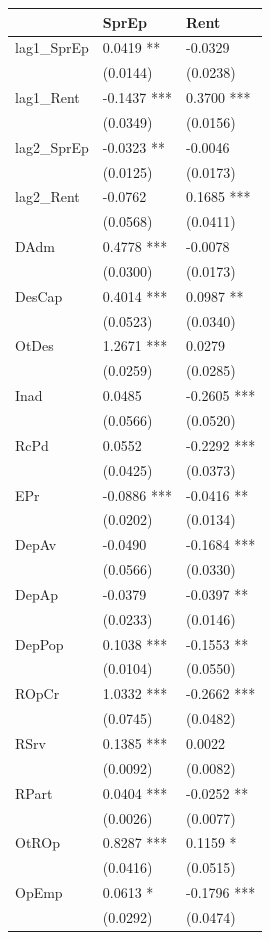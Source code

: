 \documentclass[
  12pt,
  12pt,
  openright,
  oneside,
  a4paper,
  chapter=TITLE,
  section=TITLE,
  subsection=TITLE,
  subsubsection=TITLE,
  english,
  portugues,
  sumario=tradicional]{abntex2}
\begin{document}
\begin{longtable}[]{@{}lll@{}}
\toprule
& SprEp & Rent \\
\midrule
\endhead
lag1\_SprEp & 0.0419 ** & -0.0329 \\
& (0.0144) & (0.0238) \\
lag1\_Rent & -0.1437 *** & 0.3700 *** \\
& (0.0349) & (0.0156) \\
lag2\_SprEp & -0.0323 ** & -0.0046 \\
& (0.0125) & (0.0173) \\
lag2\_Rent & -0.0762 & 0.1685 *** \\
& (0.0568) & (0.0411) \\
DAdm & 0.4778 *** & -0.0078 \\
& (0.0300) & (0.0173) \\
DesCap & 0.4014 *** & 0.0987 ** \\
& (0.0523) & (0.0340) \\
OtDes & 1.2671 *** & 0.0279 \\
& (0.0259) & (0.0285) \\
Inad & 0.0485 & -0.2605 *** \\
& (0.0566) & (0.0520) \\
RcPd & 0.0552 & -0.2292 *** \\
& (0.0425) & (0.0373) \\
EPr & -0.0886 *** & -0.0416 ** \\
& (0.0202) & (0.0134) \\
DepAv & -0.0490 & -0.1684 *** \\
& (0.0566) & (0.0330) \\
DepAp & -0.0379 & -0.0397 ** \\
& (0.0233) & (0.0146) \\
DepPop & 0.1038 *** & -0.1553 ** \\
& (0.0104) & (0.0550) \\
ROpCr & 1.0332 *** & -0.2662 *** \\
& (0.0745) & (0.0482) \\
RSrv & 0.1385 *** & 0.0022 \\
& (0.0092) & (0.0082) \\
RPart & 0.0404 *** & -0.0252 ** \\
& (0.0026) & (0.0077) \\
OtROp & 0.8287 *** & 0.1159 * \\
& (0.0416) & (0.0515) \\
OpEmp & 0.0613 * & -0.1796 *** \\
& (0.0292) & (0.0474) \\

\end{longtable}
\end{document}
